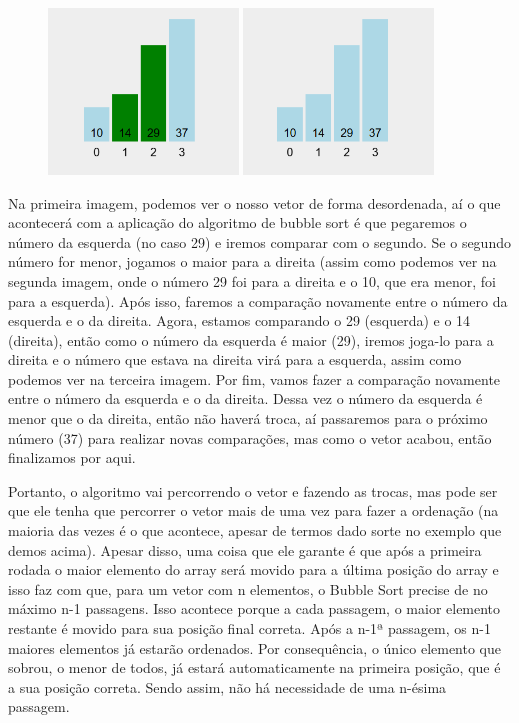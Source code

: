 \documentclass{report}
\begin{document}
	\begin{figure}[h]
		\centering
		\includegraphics[width=0.45\textwidth]{imagens/bubble-sort3.png}
		\hfill
		\includegraphics[width=0.45\textwidth]{imagens/bubble-sort4.png}
		
	\end{figure}

	Na primeira imagem, podemos ver o nosso vetor de forma desordenada, aí o que acontecerá com a aplicação do algoritmo de bubble sort é que pegaremos o número da esquerda (no caso 29) e iremos comparar com o segundo. Se o segundo número for menor, jogamos o maior para a direita (assim como podemos ver na segunda imagem, onde o número 29 foi para a direita e o 10, que era menor, foi para a esquerda). Após isso, faremos a comparação novamente entre o número da esquerda e o da direita. Agora, estamos comparando o 29 (esquerda) e o 14 (direita), então como o número da esquerda é maior (29), iremos joga-lo para a direita e o número que estava na direita virá para a esquerda, assim como podemos ver na terceira imagem. Por fim, vamos fazer a comparação novamente entre o número da esquerda e o da direita. Dessa vez o número da esquerda é menor que o da direita, então não haverá troca, aí passaremos para o próximo número (37) para realizar novas comparações, mas como o vetor acabou, então finalizamos por aqui.
	
	Portanto, o algoritmo vai percorrendo o vetor e fazendo as trocas, mas pode ser que ele tenha que percorrer o vetor mais de uma vez para fazer a ordenação (na maioria das vezes é o que acontece, apesar de termos dado sorte no exemplo que demos acima). Apesar disso, uma coisa que ele garante é que após a primeira rodada o maior elemento do array será movido para a última posição do array e isso faz com que, para um vetor com n elementos, o Bubble Sort precise de no máximo n-1 passagens. Isso acontece porque a cada passagem, o maior elemento restante é movido para sua posição final correta. Após a n-1ª passagem, os n-1 maiores elementos já estarão ordenados. Por consequência, o único elemento que sobrou, o menor de todos, já estará automaticamente na primeira posição, que é a sua posição correta. Sendo assim, não há necessidade de uma n-ésima passagem.
	
\end{document}
